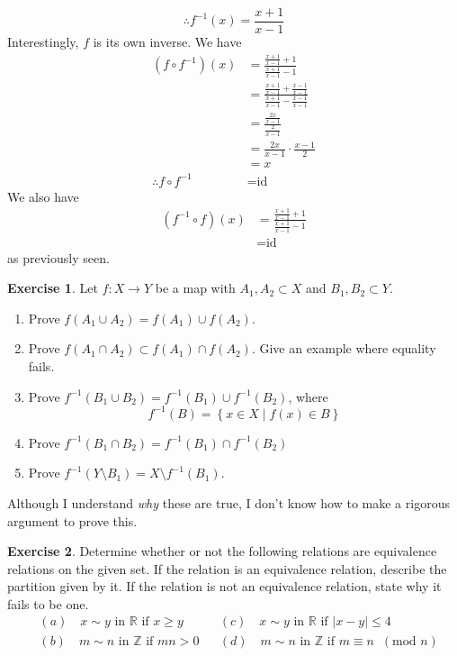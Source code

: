 \documentclass{article}
\theoremstyle{definition}
\newtheorem{environment}{Exercise}
\newenvironment{exercise}
    {\begin{mdframed}\begin{environment}}
    {\end{environment}\end{mdframed}}
\begin{document}
\[
    \therefore f^{-1} (x)=\frac{x+1}{x-1}
\]
Interestingly, \(f\) is its own inverse. We have
\begin{align*}
    \left( f\circ f^{-1}  \right) (x)&=\frac{\frac{x+1}{x-1}+1}{\frac{x+1}{x-1}-1}\\
    &=\frac{\frac{x+1}{x-1}+\frac{x-1}{x-1}}{\frac{x+1}{x-1}-\frac{x-1}{x-1}}\\
    &=\frac{\frac{2x}{x-1}}{\frac{2}{x-1}}\\
    &= \frac{2x}{x-1}\cdot \frac{x-1}{2}\\
    &=x\\
    \therefore f\circ f^{-1} &=\text{id} 
\end{align*}
We also have
\begin{align*}
    \left( f^{-1} \circ f \right) (x)&=\frac{\frac{x+1}{x-1}+1}{\frac{x+1}{x-1}-1}\\
    &=\text{id} 
\end{align*}
as previously seen.
\begin{exercise}
    Let \(f:X\to Y\) be a map with \(A_1,A_2 \subset X\) and \(B_1,B_2 \subset Y\).
    \begin{enumerate}
        \item Prove \(f \left( A_1 \cup A_2 \right)=f \left( A_1 \right)\cup f \left( A_2 \right)   \).
        \item Prove \(f \left( A_1 \cap A_2 \right) \subset f \left( A_1 \right)\cap f \left( A_2 \right)   \). Give an example where equality fails.
        \item Prove \(f^{-1} \left( B_1 \cup  B_2 \right) =f^{-1} \left( B_1 \right)\cup f^{-1} \left( B_2 \right)  \), where
        \[
            f^{-1} (B)=\left\{ x\in X\mid f(x)\in B \right\} 
        \]
        \item Prove \(f^{-1} \left( B_1 \cap B_2 \right) = f^{-1} \left( B_1 \right) \cap  f^{-1} \left( B_2 \right)   \) 
        \item Prove \(f^{-1} \left( Y\setminus B_1 \right)=X \setminus f^{-1} \left( B_1 \right)  \).
    \end{enumerate}
\end{exercise}	
Although I understand \emph{why} these are true, I don't know how to make a rigorous argument to prove this.
\begin{exercise}
    Determine whether or not the following relations are equivalence relations on the given set. If the relation is an equivalence relation, describe the partition given by it. If the relation is not an equivalence relation, state why it fails to be one.
    \begin{align*}
        &(a)\quad x\sim y\text{ in } \mathbb{R} \text{ if }x\geq y &&(c)\quad x\sim y \text{ in }\mathbb{R} \text{ if }\vert x-y \vert\leq 4\\
        &(b)\quad m\sim n\text{ in }\mathbb{Z} \text{ if }mn>0&&(d)\quad m\sim n\text{ in }\mathbb{Z} \text{ if }m\equiv n\;\;(\text{mod }n )       
    \end{align*}
\end{exercise}
\end{document}
